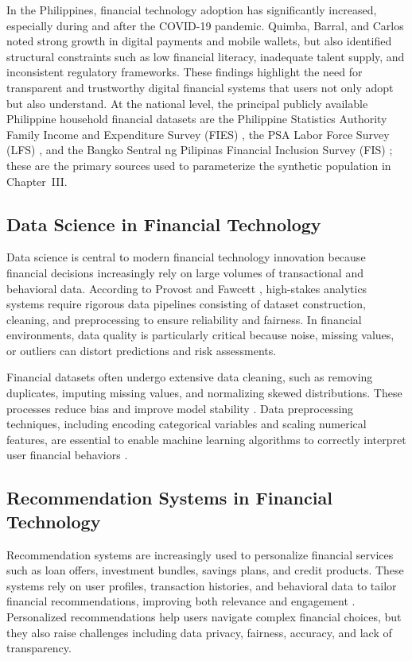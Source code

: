 \documentclass[journal]{./IEEE/IEEEtran}
\begin{document}
In the Philippines, financial technology adoption has significantly increased, especially during and after the COVID-19 pandemic. Quimba, Barral, and Carlos \cite{ref9} noted strong growth in digital payments and mobile wallets, but also identified structural constraints such as low financial literacy, inadequate talent supply, and inconsistent regulatory frameworks. These findings highlight the need for transparent and trustworthy digital financial systems that users not only adopt but also understand. At the national level, the principal publicly available Philippine household financial datasets are the Philippine Statistics Authority Family Income and Expenditure Survey (FIES) \cite{ref40}, the PSA Labor Force Survey (LFS) \cite{ref41}, and the Bangko Sentral ng Pilipinas Financial Inclusion Survey (FIS) \cite{ref35}; these are the primary sources used to parameterize the synthetic population in Chapter~III.

\subsection{Data Science in Financial Technology}
Data science is central to modern financial technology innovation because financial decisions increasingly rely on large volumes of transactional and behavioral data. According to Provost and Fawcett \cite{ref10}, high-stakes analytics systems require rigorous data pipelines consisting of dataset construction, cleaning, and preprocessing to ensure reliability and fairness. In financial environments, data quality is particularly critical because noise, missing values, or outliers can distort predictions and risk assessments.

Financial datasets often undergo extensive data cleaning, such as removing duplicates, imputing missing values, and normalizing skewed distributions. These processes reduce bias and improve model stability \cite{ref10}. Data preprocessing techniques, including encoding categorical variables and scaling numerical features, are essential to enable machine learning algorithms to correctly interpret user financial behaviors \cite{ref11}.

\subsection{Recommendation Systems in Financial Technology}
Recommendation systems are increasingly used to personalize financial services such as loan offers, investment bundles, savings plans, and credit products. These systems rely on user profiles, transaction histories, and behavioral data to tailor financial recommendations, improving both relevance and engagement \cite{ref13}. Personalized recommendations help users navigate complex financial choices, but they also raise challenges including data privacy, fairness, accuracy, and lack of transparency.
\end{document}
